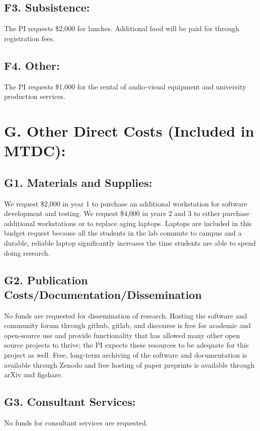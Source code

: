 \documentclass[11pt,oneside]{memoir}
\begin{document}
\subsection*{F3. Subsistence:}  The PI requests \$2,000 for lunches.  Additional food will be paid for through registration fees.

\subsection*{F4. Other:}  The PI requests \$1,000 for the rental of audio-visual equipment and university production services.

\section*{G. Other Direct Costs (Included in MTDC):}
\subsection*{G1. Materials and Supplies:}
We request \$2,000 in year 1 to purchase an additional workstation for software development and testing. We request \$4,000 in years 2 and 3 to either purchase additional workstations or to replace aging laptops.  Laptops are included in this budget request because all the students in the lab commute to campus and a durable, reliable laptop significantly increases the time students are able to spend doing research.

\subsection*{G2. Publication Costs/Documentation/Dissemination}
No funds are requested for dissemination of research.  Hosting the software and community forum through github, gitlab, and discourse is free for academic and open-source use and provide functionality that has allowed many other open source projects to thrive; the PI expects these resources to be adequate for this project as well.  Free, long-term archiving of the software and documentation is available through Zenodo and free hosting of paper preprints is available through arXiv and figshare.  %

\subsection*{G3. Consultant Services:}
No funds for consultant services are requested.
\end{document}

